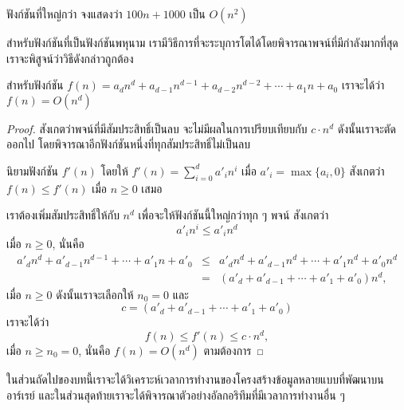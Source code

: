 \begin{quiz}{ฟังก์ชัน{\wbr}ที่{\wbr}ใหญ่{\wbr}กว่า}
จง{\wbr}แสดง{\wbr}ว่า $100n + 1000$ เป็น $O(n^2)$
\end{quiz}

สำหรับ{\wbr}ฟังก์ชัน{\wbr}ที่{\wbr}เป็น{\wbr}ฟังก์ชัน{\wbr}พหุ{\wbr}นาม{\wbr}
เรา{\wbr}มี{\wbr}วิธีการ{\wbr}ที่{\wbr}จะ{\wbr}ระบุ{\wbr}การ{\wbr}โต{\wbr}ได้{\wbr}โดย{\wbr}พิจารณา{\wbr}พจน์{\wbr}ที่{\wbr}มี{\wbr}กำลัง{\wbr}มาก{\wbr}ที่สุด เรา{\wbr}จะ{\wbr}พิสูจน์{\wbr}ว่า{\wbr}วิธี{\wbr}ดังกล่าว{\wbr}ถูกต้อง{\wbr}

\begin{theorem}
สำหรับ{\wbr}ฟังก์ชัน $f(n)=a_dn^d + a_{d-1}n^{d-1} + a_{d-2}n^{d-2} +\cdots +
a_1n + a_0$ เรา{\wbr}จะ{\wbr}ได้{\wbr}ว่า $f(n)=O(n^d)$
\end{theorem}
\begin{proof}
สังเกต{\wbr}ว่า{\wbr}พจน์{\wbr}ที่{\wbr}มี{\wbr}สัมประสิทธิ์{\wbr}เป็น{\wbr}ลบ จะ{\wbr}ไม่{\wbr}มี{\wbr}ผล{\wbr}ใน{\wbr}การ{\wbr}เปรียบเทียบ{\wbr}กับ $c\cdot n^d$
ดังนั้น{\wbr}เรา{\wbr}จะ{\wbr}ตัด{\wbr}ออก{\wbr}ไป โดย{\wbr}พิจารณา{\wbr}อีก{\wbr}ฟังก์ชัน{\wbr}หนึ่ง{\wbr}ที่{\wbr}ทุก{\wbr}สัมประสิทธิ์{\wbr}ไม่{\wbr}เป็น{\wbr}ลบ{\wbr}

นิยาม{\wbr}ฟังก์ชัน $f'(n)$ โดย{\wbr}ให้ $f'(n)=\sum_{i=0}^{d} a'_i n^i$ เมื่อ{\wbr}
$a'_i=\max\{a_i,0\}$ สังเกต{\wbr}ว่า $f(n)\leq f'(n)$ เมื่อ $n \geq 0$ เสมอ{\wbr}

เรา{\wbr}ต้อง{\wbr}เพิ่ม{\wbr}สัมประสิทธิ์{\wbr}ให้{\wbr}กับ $n^d$ เพื่อ{\wbr}จะ{\wbr}ให้{\wbr}ฟังก์ชัน{\wbr}นี้{\wbr}ใหญ่{\wbr}กว่า{\wbr}ทุก ๆ พจน์ สังเกต{\wbr}ว่า{\wbr}
\[
a'_i n^i \leq a'_i n^d
\]
เมื่อ $n\geq 0$, นั่น{\wbr}คือ{\wbr}
\begin{eqnarray*}
a'_d n^d + a'_{d-1}n^{d-1} +\cdots + a'_1n + a'_0 
&\leq&
a'_d n^d + a'_{d-1}n^d +\cdots + a'_1n^d + a'_0n^d\\
&=&
\left(a'_d + a'_{d-1} +\cdots + a'_1 + a'_0\right)n^d,
\end{eqnarray*}
เมื่อ $n\geq 0$ ดังนั้น{\wbr}เรา{\wbr}จะ{\wbr}เลือก{\wbr}ให้ $n_0=0$ และ{\wbr}
\[
c = \left(a'_d + a'_{d-1} +\cdots + a'_1 + a'_0\right)
\]
เรา{\wbr}จะ{\wbr}ได้{\wbr}ว่า{\wbr}
\[
f(n) \leq f'(n) \leq c\cdot n^d,
\]
เมื่อ $n\geq n_0=0$, นั่น{\wbr}คือ $f(n)=O(n^d)$ ตาม{\wbr}ต้องการ{\wbr}
\end{proof}

ใน{\wbr}ส่วน{\wbr}ถัด{\wbr}ไป{\wbr}ของ{\wbr}บท{\wbr}นี้{\wbr}เรา{\wbr}จะ{\wbr}ได้{\wbr}วิเคราะห์{\wbr}เวลา{\wbr}การ{\wbr}ทำงาน{\wbr}ของ{\wbr}โครงสร้าง{\wbr}ข้อมูล{\wbr}หลาย{\wbr}แบบ{\wbr}ที่{\wbr}พัฒนา{\wbr}บน{\wbr}อาร์เรย์
และ{\wbr}ใน{\wbr}ส่วน{\wbr}สุดท้าย{\wbr}เรา{\wbr}จะ{\wbr}ได้{\wbr}พิจารณา{\wbr}ตัวอย่าง{\wbr}อัล{\wbr}กอ{\wbr}ริ{\wbr}ทึม{\wbr}ที่{\wbr}มี{\wbr}เวลา{\wbr}การ{\wbr}ทำงาน{\wbr}อื่น ๆ

